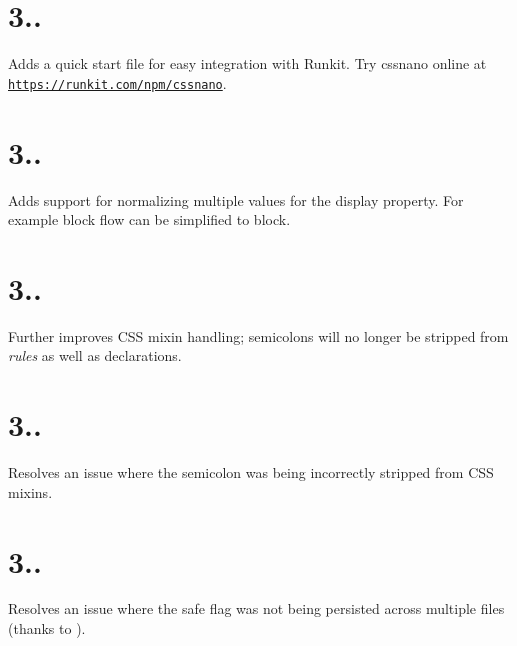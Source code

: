 \section*{3..}


\begin{DoxyItemize}
\item Adds a quick start file for easy integration with Runkit. Try cssnano online at \href{https://runkit.com/npm/cssnano}{\tt https\+://runkit.\+com/npm/cssnano}.
\end{DoxyItemize}

\section*{3..}


\begin{DoxyItemize}
\item Adds support for normalizing multiple values for the {\ttfamily display} property. For example {\ttfamily block flow} can be simplified to {\ttfamily block}.
\end{DoxyItemize}

\section*{3..}


\begin{DoxyItemize}
\item Further improves C\+SS mixin handling; semicolons will no longer be stripped from {\itshape rules} as well as declarations.
\end{DoxyItemize}

\section*{3..}


\begin{DoxyItemize}
\item Resolves an issue where the semicolon was being incorrectly stripped from C\+SS mixins.
\end{DoxyItemize}

\section*{3..}


\begin{DoxyItemize}
\item Resolves an issue where the {\ttfamily safe} flag was not being persisted across multiple files (thanks to ).
\end{DoxyItemize}


